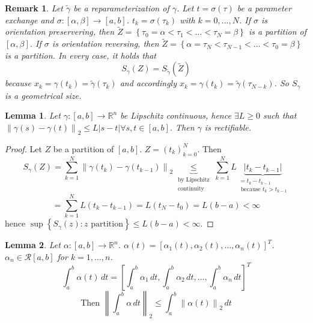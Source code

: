 \documentclass{article}
\newtheorem{lemma}{Lemma}  \numberwithin{lemma}{section}
\newtheorem{remark}{Remark}  \numberwithin{remark}{section}
\newcommand{\set}[1]{\left\{#1\right\}}
\newcommand{\norm}[1]{\left\|#1\right\|}
\newcommand{\card}[1]{\left|#1\right|}
\begin{document}
\begin{remark}
  Let $\tilde\gamma$ be a reparameterization of $\gamma$.
  Let $t = \sigma(\tau)$ be a parameter exchange and $\sigma: [\alpha, \beta] \to [a,b]$.
  $t_k = \sigma(\tau_k)$ with $k = 0, \dots, N$.
  If $\sigma$ is orientation preservering, then $\tilde Z = \set{\tau_0 = \alpha < \tau_1 < \dots < \tau_N = \beta}$ is a partition of $[\alpha, \beta]$.
  If $\sigma$ is orientation reversing, then $\tilde Z = \set{\alpha = \tau_N < \tau_{N-1} < \dots < \tau_0 = \beta}$ is a partition.
  In every case, it holds that
  \[ S_{\gamma}(Z) = S_{\tilde\gamma}(\tilde Z) \]
  because $x_k = \gamma(t_k) = \tilde\gamma(\tau_k)$ and accordingly $x_k = \gamma(t_k) = \tilde\gamma(\tau_{N-k})$.
  So $S_\gamma$ is a geometrical size.
\end{remark}

\begin{lemma} %
  Let $\gamma: [a, b] \to \mathbb R^n$ be Lipschitz continuous, hence $\exists L \geq 0$ such that $\norm{\gamma(s) - \gamma(t)}_2 \leq L \card{s - t} \forall s, t \in [a,b]$. Then $\gamma$ is rectifiable.
\end{lemma}

\begin{proof}
  Let $Z$ be a partition of $[a,b]$. $Z = (t_k)_{k=0}^N$. Then
  \[ S_{\gamma}(Z) = \sum_{k=1}^N \norm{\gamma(t_k) - \gamma(t_{k-1})}_2 \underbrace{\leq}_{\substack{\text{by Lipschitz} \\ \text{continuity}}} \sum_{k=1}^N L \underbrace{\card{t_k - t_{k-1}}}_{\substack{= t_k - t_{k-1} \\ \text{ because } t_k > t_{k-1}}} \]
  \[ = \sum_{k=1}^N L(t_k - t_{k-1}) = L(t_N - t_0) = L(b - a) < \infty \]
  hence $\sup\set{S_{\gamma}(z): z \text{ partition}} \leq L(b - a) < \infty$.
\end{proof}

\begin{lemma} %
  Let $\alpha: [a,b] \to \mathbb R^n$. $\alpha(t) = \left[\alpha_1(t), \alpha_2(t), \dots, \alpha_n(t)\right]^T$.
  $\alpha_n \in \mathcal R[a,b]$ for $k = 1, \dots, n$.
  \[ \int_a^b \alpha(t) \, dt = \left[\int_a^b \alpha_1 \, dt, \int_a^b \alpha_2 \, dt, \dots, \int_a^b \alpha_n \, dt\right]^T \]
  \[ \text{Then } \norm{\int_a^b \alpha \, dt}_2 \leq \int_a^b \norm{\alpha(t)}_2 \, dt \]
\end{lemma}
\end{document}
